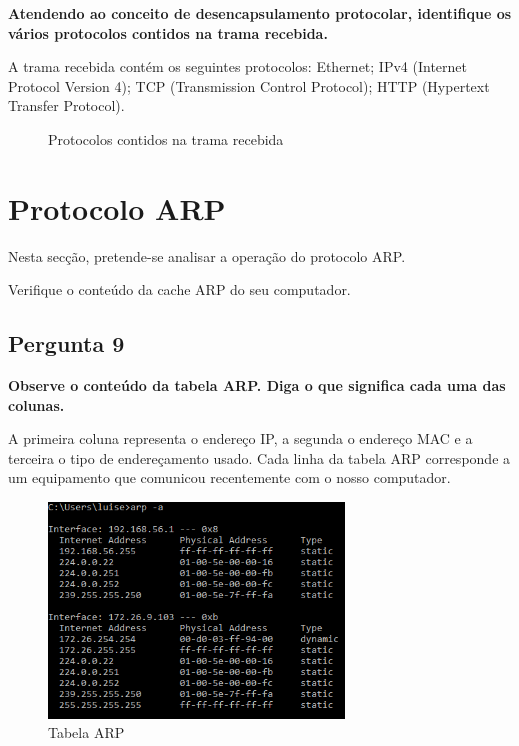 \documentclass[11pt]{article}
\begin{document}
\textbf{Atendendo ao conceito de desencapsulamento protocolar, identifique os vários protocolos contidos na trama recebida.}

A trama recebida contém os seguintes protocolos: Ethernet; IPv4 (Internet Protocol Version 4); TCP (Transmission Control Protocol); HTTP (Hypertext Transfer Protocol).

\begin{figure}[hbt!]
    \centering
    \caption{Protocolos contidos na trama recebida}
\end{figure}


\clearpage
\section{Protocolo ARP}

Nesta secção, pretende-se analisar a operação do protocolo ARP.

Verifique o conteúdo da cache ARP do seu computador.

\vspace{0.5cm}

\subsection{Pergunta 9}

\textbf{Observe o conteúdo da tabela ARP. Diga o que significa cada uma das colunas.}

A primeira coluna representa o endereço IP, a segunda o endereço MAC e a terceira o tipo de endereçamento usado. Cada linha da tabela ARP corresponde a um equipamento que comunicou recentemente com o nosso computador.

\begin{figure}[hbt!]
    \centering
    \includegraphics[width=0.7\textwidth]{images/cap4/tabela_ARP.png}
    \caption{Tabela ARP}
\end{figure}
\end{document}
